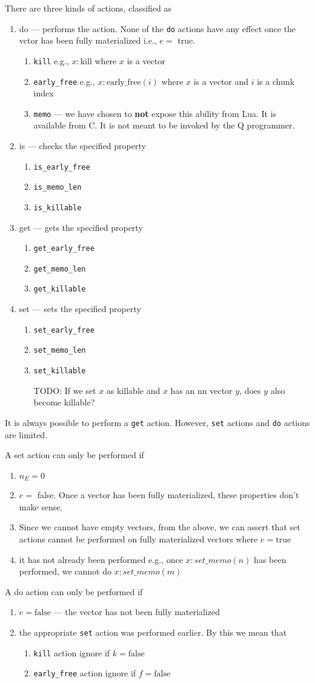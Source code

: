 \documentclass[letterpaper,12pt]{article}
\newcommand{\TBC}{\framebox{\textbf{TO BE COMPLETED}}}
\newcommand{\be}{\begin{enumerate}}
\newcommand{\ee}{\end{enumerate}}
\begin{document}
There are three kinds of actions, classified as 
\be
\item do  --- performs the action.
  None of the {\tt do} actions have any effect once the vctor has been fully
  materialized i.e., \(e = \) true. 
  \be
\item {\tt kill} e.g., \(x:\mathrm{kill}\) where \(x\) is a vector 
\item {\tt early\_free} e.g., 
  \(x:\mathrm{early\_free}(i)\) where \(x\) is a vector and \(i\) is a chunk index
\item {\tt memo} --- we have chosen to {\bf not} expose this ability 
  from Lua. It is available from C. It is not meant to be invoked by the Q
  programmer. 
  \ee
\item is --- checks the specified property
  \be
\item {\tt is\_early\_free}
\item {\tt is\_memo\_len}
\item {\tt is\_killable}
  \ee
\item get --- gets the specified property
  \be
\item {\tt get\_early\_free}
\item {\tt get\_memo\_len}
\item {\tt get\_killable}
  \ee
\item set --- sets the specified property
  \be
\item {\tt set\_early\_free}
\item {\tt set\_memo\_len}
\item {\tt set\_killable}

  TODO: If we set \(x\) as killable and \(x\) has an nn vector \(y\), does \(y\)
  also become killable? \TBC
  
  \ee
\ee

It is always possible to perform a {\tt get} action. However, {\tt set} actions
and {\tt do} actions are limited. 

A set action can only be performed if 
\be
\item \(n_E = 0\)
\item \(e = \) false. Once a vector has been fully materialized, 
  these properties don't make sense.
\item Since we cannot have empty vectors, from the above, we can assert that set
  actions cannot be performed on fully materialized vectors where 
  \(e = \mathrm{true}\)
\item it has not already been performed e.g., once \(x:set\_memo(n)\) 
  has been performed, we cannot do \(x:set\_memo(m)\)
\ee

A do action can only be performed if 
\be
\item \(e = \mathrm{false}\) --- the vector has not been fully materialized
\item the appropriate {\tt set} action was performed earlier. By this we mean
  that
  \be
\item {\tt kill} action ignore if \(k = \mathrm{false}\)
\item {\tt early\_free} action ignore if \(f = \mathrm{false}\)
  \ee
  \ee
\end{document}
